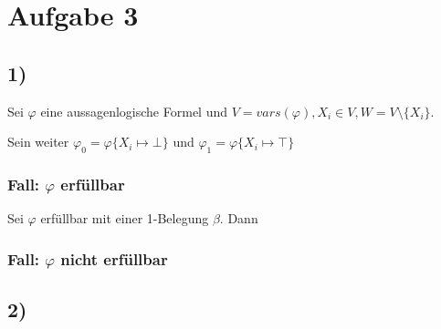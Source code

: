 \section*{Aufgabe 3}

\subsection*{1)}

Sei $\varphi$ eine aussagenlogische Formel und $V = vars(\varphi),X_i \in V, W = V \setminus \{X_i\}$.

Sein weiter $\varphi_0 = \varphi\{X_i \mapsto \bot\}$ 
und $\varphi_1 = \varphi\{X_i \mapsto \top\}$ 

\subsubsection*{Fall: $\varphi$ erfüllbar}
Sei $\varphi$ erfüllbar mit einer 1-Belegung $\beta$.
Dann 

\subsubsection*{Fall: $\varphi$ nicht erfüllbar}

\subsection*{2)}